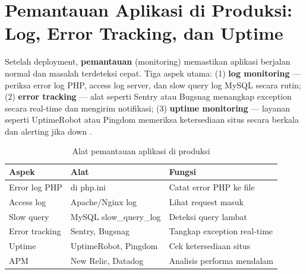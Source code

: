 \section{Pemantauan Aplikasi di Produksi: Log, Error Tracking, dan Uptime}

Setelah deployment, \textbf{pemantauan} (monitoring) memastikan aplikasi berjalan normal dan masalah terdeteksi cepat. Tiga aspek utama: (1) \textbf{log monitoring} --- periksa error log PHP, access log server, dan slow query log MySQL secara rutin; (2) \textbf{error tracking} --- alat seperti Sentry atau Bugsnag menangkap exception secara real-time dan mengirim notifikasi; (3) \textbf{uptime monitoring} --- layanan seperti UptimeRobot atau Pingdom memeriksa ketersediaan situs secara berkala dan alerting jika down \cite{mdnDeploy}.

\begin{table}[ht]
\centering
\begin{tabular}{|P{3cm}|P{4.5cm}|P{5cm}|}
\hline
\textbf{Aspek} & \textbf{Alat} & \textbf{Fungsi} \\
\hline
Error log PHP &  di php.ini & Catat error PHP ke file \\
\hline
Access log & Apache/Nginx log & Lihat request masuk \\
\hline
Slow query & MySQL slow\_query\_log & Deteksi query lambat \\
\hline
Error tracking & Sentry, Bugsnag & Tangkap exception real-time \\
\hline
Uptime & UptimeRobot, Pingdom & Cek ketersediaan situs \\
\hline
APM & New Relic, Datadog & Analisis performa mendalam \\
\hline
\end{tabular}
\caption{Alat pemantauan aplikasi di produksi}
\end{table}

